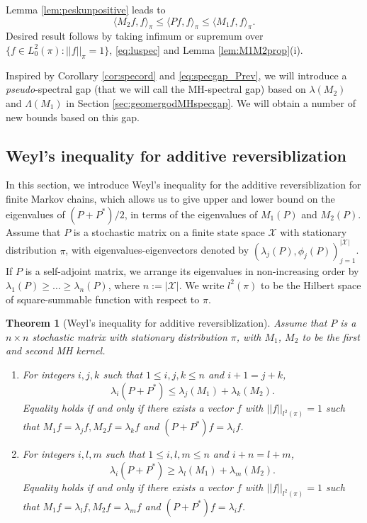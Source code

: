 \documentclass[12pt,a4]{amsart}
\numberwithin{equation}{section}
\theoremstyle{plain}
\newtheorem{theorem}{Theorem}[section]
\theoremstyle{definition}
\theoremstyle{remark}
\let\oldendproof\endproof
\renewenvironment{proof}[1][\proofname]{%
  \oldproof[\noindent\textbf{#1.} ]%
}{\oldendproof}
\newcommand{\1}{\mathds{1}}
\renewcommand{\leq}{\leqslant}
\renewcommand{\geq}{\geqslant}
\begin{document}
\begin{proof}
	Lemma \ref{lem:peskunpositive} leads to
	$$\langle M_2 f,f \rangle_{\pi} \leq \langle Pf,f \rangle_{\pi} \leq \langle M_1 f,f \rangle_{\pi}.$$
	Desired result follows by taking infimum or supremum over $\{f \in L^2_0(\pi) : ||f||_{\pi}=1\}$, \eqref{eq:luspec} and Lemma \ref{lem:M1M2prop}(i).
\end{proof}

Inspired by Corollary \ref{cor:specord} and \eqref{eq:specgap_Prev}, we will introduce a \textit{pseudo}-spectral gap (that we will call the MH-spectral gap) based on $\lambda(M_2)$ and $\Lambda(M_1)$ in Section \ref{sec:geomergodMHspecgap}. We will obtain a number of new bounds based on this gap.

\subsection{Weyl's inequality for additive reversiblization}\label{sec:weyl}

In this section, we introduce Weyl's inequality for the additive reversiblization for finite Markov chains, which allows us to give upper and lower bound on the eigenvalues of $(P+P^*)/2$, in terms of the eigenvalues of $M_1(P)$ and $M_2(P)$. Assume that $P$ is a stochastic matrix on a finite state space $\mathcal{X}$ with stationary distribution $\pi$, with eigenvalues-eigenvectors denoted by $(\lambda_j(P),\phi_j(P))_{j=1}^{|\mathcal{X}|}$. If $P$ is a self-adjoint matrix, we arrange its eigenvalues in non-increasing order by $\lambda_1(P) \geq \ldots \geq \lambda_n(P)$, where $n := |\mathcal{X}|$. We write $l^2(\pi)$ to be the Hilbert space of square-summable function with respect to $\pi$. 

\begin{theorem}[Weyl's inequality for additive reversiblization]\label{thm:weyl}
	Assume that $P$ is a $n \times n$ stochastic matrix with stationary distribution $\pi$, with $M_1$, $M_2$ to be the first and second MH kernel.
	\begin{enumerate}[label={\upshape(\roman*)}, align=left, widest=iii, leftmargin=*]
		\item For integers $i,j,k$ such that $1 \leq i,j,k \leq n$ and $i+1 = j+k$,
		$$\lambda_i(P+P^*) \leq \lambda_j(M_1) + \lambda_k(M_2).$$
		Equality holds if and only if there exists a vector $f$ with $||f||_{l^2(\pi)} = 1$ such that $M_1f = \lambda_j f, M_2f = \lambda_k f$ and $(P+P^*)f = \lambda_i f$.
		
		\item For integers $i,l,m$ such that $1 \leq i,l,m \leq n$ and $i+n = l+m$,
		$$\lambda_i(P+P^*) \geq \lambda_l(M_1) + \lambda_m(M_2).$$
		Equality holds if and only if there exists a vector $f$ with $||f||_{l^2(\pi)} = 1$ such that $M_1f = \lambda_l f, M_2f = \lambda_m f$ and $(P+P^*)f = \lambda_i f$.
	\end{enumerate}
\end{theorem}
\end{document}
